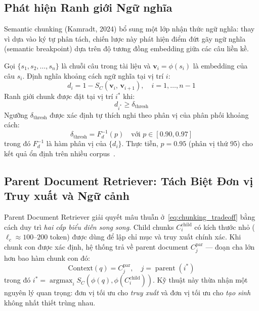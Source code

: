 \documentclass[12pt,a4paper]{report}
\theoremstyle{plain}
\theoremstyle{definition}
\DeclareMathOperator*{\argmax}{argmax}
\begin{document}
	\subsection{Phát hiện Ranh giới Ngữ nghĩa}
	\label{subsec:semantic_boundary}
	
	Semantic chunking (Kamradt, 2024) bổ sung một lớp nhận thức ngữ nghĩa:
	thay vì dựa vào ký tự phân tách, chiến lược này phát hiện điểm đứt gãy
	ngữ nghĩa (semantic breakpoint) dựa trên độ tương đồng embedding giữa các
	câu liền kề.
	
	Gọi $\{s_1, s_2, \ldots, s_n\}$ là chuỗi câu trong tài liệu và
	$\mathbf{v}_i = \phi(s_i)$ là embedding của câu $s_i$. Định nghĩa khoảng
	cách ngữ nghĩa tại vị trí $i$:
	\begin{equation}
		d_i = 1 - S_C(\mathbf{v}_i,\, \mathbf{v}_{i+1}), \quad i = 1, \ldots, n-1
		\label{eq:semantic_dist}
	\end{equation}
	Ranh giới chunk được đặt tại vị trí $i^*$ khi:
	\begin{equation}
		d_{i^*} \geq \delta_{\text{thresh}}
		\label{eq:semantic_breakpoint}
	\end{equation}
	Ngưỡng $\delta_{\text{thresh}}$ được xác định tự thích nghi theo phân vị
	của phân phối khoảng cách:
	\begin{equation}
		\delta_{\text{thresh}} = F^{-1}_{d}(p)
		\quad \text{với } p \in [0.90, 0.97]
		\label{eq:threshold_adaptive}
	\end{equation}
	trong đó $F^{-1}_d$ là hàm phân vị của $\{d_i\}$. Thực tiễn, $p = 0.95$
	(phân vị thứ 95) cho kết quả ổn định trên nhiều corpus~\cite{chroma2024eval}.
	
	\subsection{Parent Document Retriever: Tách Biệt Đơn vị Truy xuất và Ngữ cảnh}
	\label{subsec:parent_doc}
	
	Parent Document Retriever giải quyết mâu thuẫn ở~\eqref{eq:chunking_tradeoff}
	bằng cách duy trì \emph{hai cấp biểu diễn song song}. Child chunks
	$C_i^{\text{child}}$ có kích thước nhỏ ($\ell_c \approx 100$--$200$ token)
	được dùng để lập chỉ mục và truy xuất chính xác. Khi chunk con được xác
	định, hệ thống trả về parent document $C_j^{\text{par}}$ --- đoạn cha lớn
	hơn bao hàm chunk con đó:
	\begin{equation}
		\text{Context}(q) = C_j^{\text{par}}, \quad
		j = \operatorname{parent}(i^*)
		\label{eq:parent_doc}
	\end{equation}
	trong đó $i^* = \argmax_{i} S_C(\phi(q), \phi(C_i^{\text{child}}))$.
	Kỹ thuật này thừa nhận một nguyên lý quan trọng: đơn vị tối ưu cho
	\emph{truy xuất} và đơn vị tối ưu cho \emph{tạo sinh} không nhất thiết
	trùng nhau.
	
\end{document}
